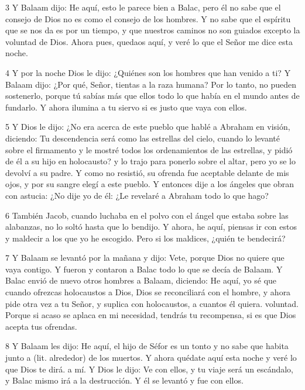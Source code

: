 \par 3 Y Balaam dijo: He aquí, esto le parece bien a Balac, pero él no sabe que el consejo de Dios no es como el consejo de los hombres. Y no sabe que el espíritu que se nos da es por un tiempo, y que nuestros caminos no son guiados excepto la voluntad de Dios. Ahora pues, quedaos aquí, y veré lo que el Señor me dice esta noche.

\par 4 Y por la noche Dios le dijo: ¿Quiénes son los hombres que han venido a ti? Y Balaam dijo: ¿Por qué, Señor, tientas a la raza humana? Por lo tanto, no pueden sostenerlo, porque tú sabías más que ellos todo lo que había en el mundo antes de fundarlo. Y ahora ilumina a tu siervo si es justo que vaya con ellos.

\par 5 Y Dios le dijo: ¿No era acerca de este pueblo que hablé a Abraham en visión, diciendo: Tu descendencia será como las estrellas del cielo, cuando lo levanté sobre el firmamento y le mostré todos los ordenamientos de las estrellas, y pidió de él a su hijo en holocausto? y lo trajo para ponerlo sobre el altar, pero yo se lo devolví a su padre. Y como no resistió, su ofrenda fue aceptable delante de mis ojos, y por su sangre elegí a este pueblo. Y entonces dije a los ángeles que obran con astucia: ¿No dije yo de él: ¿Le revelaré a Abraham todo lo que hago?

\par 6 También Jacob, cuando luchaba en el polvo con el ángel que estaba sobre las alabanzas, no lo soltó hasta que lo bendijo. Y ahora, he aquí, piensas ir con estos y maldecir a los que yo he escogido. Pero si los maldices, ¿quién te bendecirá?

\par 7 Y Balaam se levantó por la mañana y dijo: Vete, porque Dios no quiere que vaya contigo. Y fueron y contaron a Balac todo lo que se decía de Balaam. Y Balac envió de nuevo otros hombres a Balaam, diciendo: He aquí, yo sé que cuando ofrezcas holocaustos a Dios, Dios se reconciliará con el hombre, y ahora pide otra vez a tu Señor, y suplica con holocaustos, a cuantos él quiera. voluntad. Porque si acaso se aplaca en mi necesidad, tendrás tu recompensa, si es que Dios acepta tus ofrendas.

\par 8 Y Balaam les dijo: He aquí, el hijo de Séfor es un tonto y no sabe que habita junto a (lit. alrededor) de los muertos. Y ahora quédate aquí esta noche y veré lo que Dios te dirá. a mí. Y Dios le dijo: Ve con ellos, y tu viaje será un escándalo, y Balac mismo irá a la destrucción. Y él se levantó y fue con ellos.

